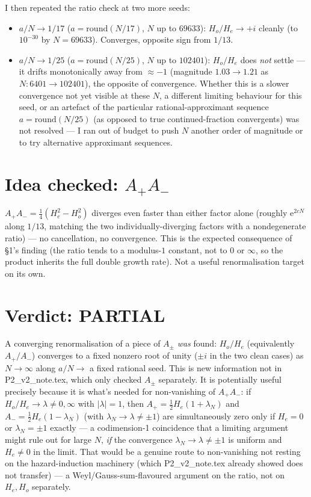 \documentclass[11pt]{article}
\newcommand{\e}{\mathrm{e}}
\begin{document}
I then repeated the ratio check at two more seeds:
\begin{itemize}
\item $a/N\to1/17$ ($a=\mathrm{round}(N/17)$, $N$ up to $69633$): $H_o/H_e\to +i$ cleanly (to $10^{-30}$ by $N=69633$). Converges,
opposite sign from $1/13$.
\item $a/N\to1/25$ ($a=\mathrm{round}(N/25)$, $N$ up to $102401$): $H_o/H_e$ does \emph{not} settle — it drifts monotonically
away from $\approx-1$ (magnitude $1.03\to1.21$ as $N: 6401\to102401$), the opposite of convergence. Whether this is a slower
convergence not yet visible at these $N$, a different limiting behaviour for this seed, or an artefact of the particular
rational-approximant sequence $a=\mathrm{round}(N/25)$ (as opposed to true continued-fraction convergents) was not
resolved — I ran out of budget to push $N$ another order of magnitude or to try alternative approximant sequences.
\end{itemize}

\section{Idea checked: $A_+A_-$}
$A_+A_-=\tfrac14(H_e^2-H_o^2)$ diverges even faster than either factor alone (roughly $\e^{2cN}$ along $1/13$, matching
the two individually-diverging factors with a nondegenerate ratio) — no cancellation, no convergence. This is the
expected consequence of \S1's finding (the ratio tends to a modulus-$1$ constant, not to $0$ or $\infty$, so the product
inherits the full double growth rate). Not a useful renormalisation target on its own.

\section{Verdict: PARTIAL}
A converging renormalisation of a piece of $A_\pm$ \emph{was} found: $H_o/H_e$ (equivalently $A_+/A_-$) converges to a
fixed nonzero root of unity ($\pm i$ in the two clean cases) as $N\to\infty$ along $a/N\to$ a fixed rational seed. This
is new information not in P2\_v2\_note.tex, which only checked $A_\pm$ separately. It is potentially useful precisely
because it is what's needed for non-vanishing of $A_+A_-$: if $H_o/H_e\to\lambda\ne0,\infty$ with $|\lambda|=1$, then
$A_+=\tfrac12H_e(1+\lambda_N)$ and $A_-=\tfrac12H_e(1-\lambda_N)$ (with $\lambda_N\to\lambda\ne\pm1$) are simultaneously
zero only if $H_e=0$ or $\lambda_N=\pm1$ exactly — a codimension-1 coincidence that a limiting argument might rule out
for large $N$, \emph{if} the convergence $\lambda_N\to\lambda\ne\pm1$ is uniform and $H_e\ne0$ in the limit. That would
be a genuine route to non-vanishing not resting on the hazard-induction machinery (which P2\_v2\_note.tex already showed
does not transfer) — a Weyl/Gauss-sum-flavoured argument on the ratio, not on $H_e,H_o$ separately.
\end{document}
